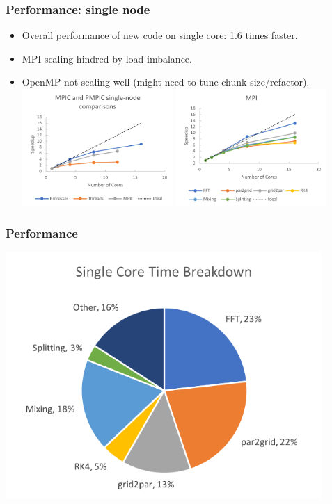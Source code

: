 \documentclass{beamer}
\begin{document}
\begin{frame}
\frametitle{Performance: single node}

\begin{itemize}
\item Overall performance of new code on single core: 1.6 times faster.
\item MPI scaling hindred by load imbalance.
\item OpenMP not scaling well (might need to tune chunk size/refactor).
\includegraphics[width=0.45\textwidth]{pmpic_images/singleNode.png} 
\includegraphics[width=0.45\textwidth]{pmpic_images/MPISingle.png} 
\end{itemize}

\end{frame}

\begin{frame}
\frametitle{Performance}

\includegraphics[width=0.90\textwidth]{pmpic_images/pie.png} 

\end{frame}
\end{document}
